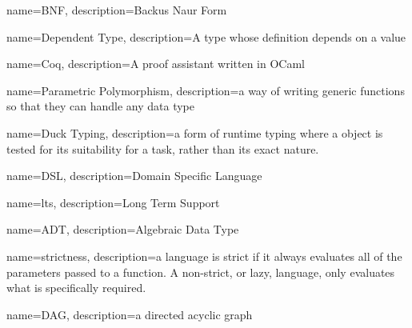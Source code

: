 {%
    name=BNF,
    description={Backus Naur Form}
}

{%
    name={Dependent Type},
    description={A type whose definition depends on a value}
}

{%
    name=Coq,
    description={A proof assistant written in OCaml}
}

{%
    name={Parametric Polymorphism},
    description={a way of writing generic functions so that they can handle any data type}
}

{%
    name={Duck Typing},
    description={a form of runtime typing where a object is tested for its suitability for a task,
    rather than its exact nature.}
}

{%
    name={DSL},
    description={Domain Specific Language}
}

{%
    name={lts},
    description={Long Term Support}
}

{%
    name={ADT},
    description={Algebraic Data Type}
}

{%
    name={strictness},
    description={a language is strict if it always evaluates all of the parameters passed to a
    function. A non-strict, or lazy, language, only evaluates what is specifically required.}
}

{%
    name={DAG},
    description={a directed acyclic graph}

}
